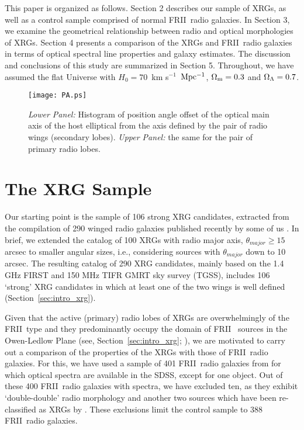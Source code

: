\documentclass[twocolumn]{aastex62}
\def\frii{FR{II}~}
\def\kms{km s$^{-1}$}
\begin{document}
This paper is organized as follows. Section 2 describes our sample of
XRGs, as well as a control sample comprised of normal \frii radio galaxies. 
In Section 3,  we examine the geometrical relationship between radio and 
optical morphologies of XRGs. Section 4 presents a comparison of the XRGs 
and \frii radio galaxies in terms of optical spectral line properties 
and galaxy estimates. The discussion and conclusions of this study are 
summarized in Section 5. Throughout, we have assumed the flat Universe 
with $H_0 = 70$~\kms\ $\rm Mpc^{-1}$, $\Omega_{\rm m} = 0.3$ and 
$\Omega_{\rm \Lambda} = 0.7$.


 \begin{figure}
  \centering
\texttt{[image: PA.ps]} 
  \caption{\emph{Lower Panel:} Histogram of position angle offset of 
 the optical main axis of the host elliptical from the axis defined 
 by the pair of radio wings (secondary lobes). \emph{Upper Panel:} the 
 same for the pair of primary radio lobes.}
\label{fig:pa}
 \end{figure}


\section{The XRG Sample}
\label{sec:sample}
Our starting point is the sample of 106 strong XRG candidates, extracted
from the compilation of 290 winged radio galaxies published recently by
some of us \citep{Yang2019arXiv190506356Y}. In brief, we extended 
the catalog of 100 XRGs with radio major axis, $\theta_{major} \ge 15$
arcsec \citep{Cheung2007AJ....133.2097C} to smaller angular sizes, 
i.e.,  considering sources with $\theta_{major}$  down to 10 arcsec. The resulting
catalog of 290 XRG candidates, mainly based on the 1.4 GHz FIRST and 150 MHz 
TIFR GMRT sky survey (TGSS), includes  106 `strong' XRG candidates in
which at least one of the two wings is well defined (Section~\ref{sec:intro_xrg}).

Given that the active (primary) radio lobes of XRGs are overwhelmingly
of the \frii type and they predominantly occupy the domain of \frii
sources in the Owen-Ledlow Plane (see, Section~\ref{sec:intro_xrg}; \citealt{Yang2019arXiv190506356Y}), 
we are motivated to carry out a comparison of the properties of the 
XRGs with those of \frii radio galaxies. For this, we have used a sample 
of 401 \frii radio galaxies from \citet{Koziel2011MNRAS.415.1013K} for 
which optical spectra are available in the SDSS, except for one object. 
Out of these 400 \frii radio galaxies with spectra, we have excluded ten, as they 
exhibit `double-double' radio morphology \citep{Schoenmakers2000MNRAS.315..371S} 
and another two sources which have been re-classified as XRGs by 
\citet[][]{Kuzmicz2017MNRAS.471.3806K}. These exclusions limit the
control sample to 388 \frii radio galaxies.
\end{document}
